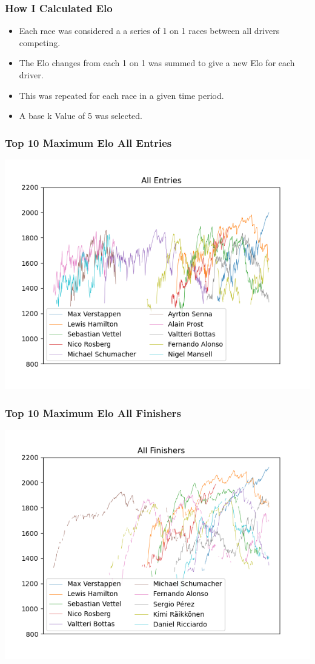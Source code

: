 \documentclass{beamer}
\begin{document}
\begin{frame}
    \frametitle{How I Calculated Elo}
    \begin{itemize}
        \item Each race was considered a a series of 1 on 1 races between all drivers competing.
        \item The Elo changes from each 1 on 1 was summed to give a new Elo for each driver.
        \item This was repeated for each race in a given time period.
        \item A base k Value of 5 was selected.
    \end{itemize}
\end{frame}

\begin{frame}
    \frametitle{Top 10 Maximum Elo All Entries}
    \includegraphics[width=\textwidth]{AllTimeTop10EloAll.png}
\end{frame}

\begin{frame}
    \frametitle{Top 10 Maximum Elo All Finishers}
    \includegraphics[width=\textwidth]{AllTimeTop10EloFinished.png}
\end{frame}
\end{document}
